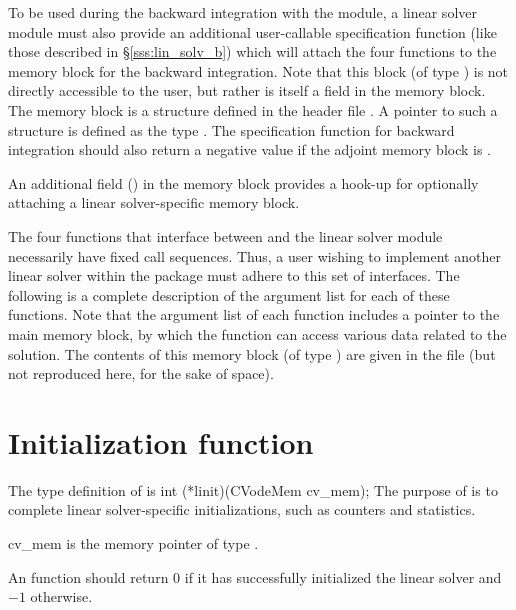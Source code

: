 To be used during the backward integration with the {\cvodes} module,
a linear solver module must also provide an additional user-callable
specification function (like those described in
\S\ref{sss:lin_solv_b}) which will attach the four functions to the
{\cvodes} memory block for the backward integration. Note that this
block (of type ) is not directly accessible to
the user, but rather is itself a field in the
{\cvodes} memory block.  The {\cvodes} memory block is a structure
defined in the header file .  A pointer to such a
structure is defined as the type .
The specification function for backward integration should also return
a negative value if the adjoint {\cvodes} memory block is .

An additional field () in the {\cvodes} memory block
provides a hook-up for optionally attaching a linear solver-specific
memory block.

The four functions that interface between {\cvodes} and the linear solver module
necessarily have fixed call sequences.  Thus, a user wishing to implement another 
linear solver within the {\cvodes} package must adhere to this set of interfaces.
The following is a complete description of the argument list for each of
these functions.  Note that the argument list of each function includes a
pointer to the main {\cvodes} memory block, by which the function can access
various data related to the {\cvodes} solution.  The contents of this memory
block (of type ) are given in the file  
(but not reproduced here, for the sake of space).


\section{Initialization function}
The type definition of  is
{
  int (*linit)(CVodeMem cv\_mem);
}
{
  The purpose of  is to complete linear solver-specific initializations,
  such as counters and statistics.        
}
{
  \begin{args}[cv\_mem]
  \item[cv\_mem]
    is the {\cvodes} memory pointer of type .
  \end{args}
}
{
  An  function should return $0$ if it 
  has successfully initialized the {\cvodes} linear solver and 
  $-1$ otherwise. 
}
{}

